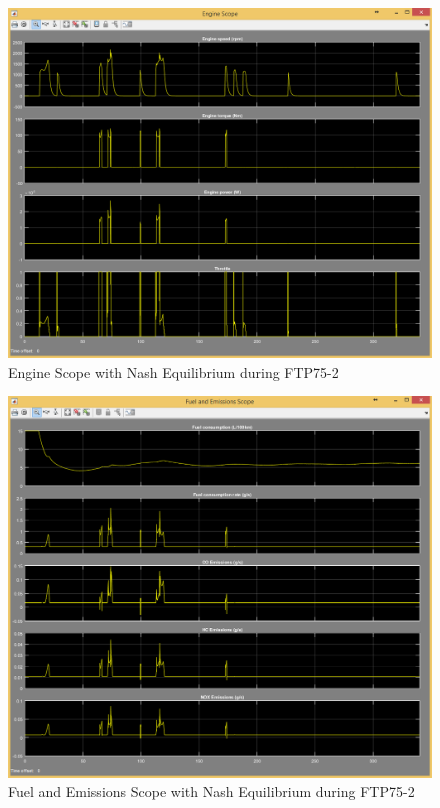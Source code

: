\begin{figure}[h]
\centering
\includegraphics[scale=0.37]{figures/NashEquilibrium/FTP75-2/engine13Juni}
\caption{Engine Scope with Nash Equilibrium during FTP75-2}
\label{fig:ene2}
\end{figure}

\begin{figure}[h]
\centering
\includegraphics[scale=0.4]{figures/NashEquilibrium/FTP75-2/fuelEmissions13Juni}
\caption{Fuel and Emissions Scope with Nash Equilibrium during FTP75-2}
\label{fig:fene2}
\end{figure}

